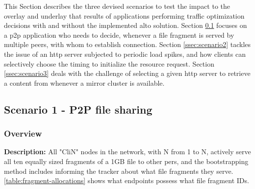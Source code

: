 \label{sec:experiments-scenarios}

    This Section describes the three devised scenarios to test the impact to the overlay and underlay that results of applications performing traffic optimization decisions with and without the implemented \gls{alto} solution.
    Section \ref{ssec:scenario1} focuses on a \gls{p2p} application who needs to decide, whenever a file fragment is served by multiple peers, with whom to establish connection.
    Section \ref{ssec:scenario2} tackles the issue of an \gls{http} server subjected to periodic load spikes, and how clients can selectively choose the timing to initialize the resource request.
    Section \ref{ssec:scenario3} deals with the challenge of selecting a given \gls{http} server to retrieve a content from whenever a mirror cluster is available.

\subsection{Scenario 1 - P2P file sharing}

\label{ssec:scenario1}

\subsubsection{Overview}

\textbf{Description:} All "CliN" nodes in the network, with N from 1 to N, actively serve all ten equally sized fragments of a 1GB file to other pers, and the bootstrapping method includes informing the tracker about what file fragments they serve.
    \ref{table:fragment-allocations} shows what endpoints possess what file fragment IDs.

